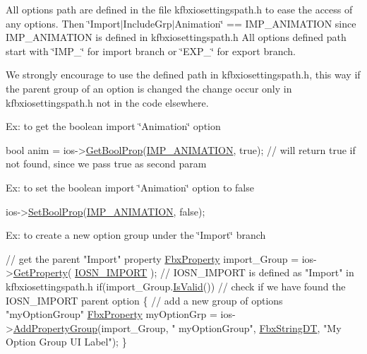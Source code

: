 All options path are defined in the file kfbxiosettingspath.\+h to ease the access of any options. Then \char`\"{}\+Import$\vert$\+Include\+Grp$\vert$\+Animation\char`\"{} == I\+M\+P\+\_\+\+A\+N\+I\+M\+A\+T\+I\+ON since I\+M\+P\+\_\+\+A\+N\+I\+M\+A\+T\+I\+ON is defined in kfbxiosettingspath.\+h All options defined path start with \char`\"{}\+I\+M\+P\+\_\+\char`\"{} for import branch or \char`\"{}\+E\+X\+P\+\_\+\char`\"{} for export branch.

We strongly encourage to use the defined path in kfbxiosettingspath.\+h, this way if the parent group of an option is changed the change occur only in kfbxiosettingspath.\+h not in the code elsewhere.

Ex\+: to get the boolean import \char`\"{}\+Animation\char`\"{} option 
\begin{DoxyCode}
\textcolor{keywordtype}{bool} anim = ios->\hyperlink{class_fbx_i_o_settings_aa30a3e515f60aa1fcbd82b6b34994ad0}{GetBoolProp}(\hyperlink{fbxiosettingspath_8h_a4725ab27021bd095307ee7337fd7ffe2}{IMP\_ANIMATION}, \textcolor{keyword}{true}); \textcolor{comment}{// will return true if not
       found, since we pass true as second param}
\end{DoxyCode}


Ex\+: to set the boolean import \char`\"{}\+Animation\char`\"{} option to false 
\begin{DoxyCode}
ios->\hyperlink{class_fbx_i_o_settings_ad2c660ef846b66dcf569079299391745}{SetBoolProp}(\hyperlink{fbxiosettingspath_8h_a4725ab27021bd095307ee7337fd7ffe2}{IMP\_ANIMATION}, \textcolor{keyword}{false});
\end{DoxyCode}


Ex\+: to create a new option group under the \char`\"{}\+Import\char`\"{} branch 
\begin{DoxyCode}
\textcolor{comment}{// get the parent "Import" property}
\hyperlink{class_fbx_property}{FbxProperty} import\_Group = ios->\hyperlink{class_fbx_i_o_settings_aa02805702152a4ef56d337c25b12d42b}{GetProperty}( \hyperlink{fbxiosettingspath_8h_aee0d01937267b561485abe6e148243ec}{IOSN\_IMPORT} ); \textcolor{comment}{// IOSN\_IMPORT
       is defined as "Import" in kfbxiosettingspath.h}
\textcolor{keywordflow}{if}(import\_Group.\hyperlink{class_fbx_property_a1c40042c55d1f4a1d4837f06fbc1d764}{IsValid}()) \textcolor{comment}{// check if we have found the IOSN\_IMPORT parent option}
\{
    \textcolor{comment}{// add a new group of options "myOptionGroup"}
      \hyperlink{class_fbx_property}{FbxProperty} myOptionGrp = ios->\hyperlink{class_fbx_i_o_settings_abf6db228c12b2b36500eba034685b3cb}{AddPropertyGroup}(import\_Group, \textcolor{stringliteral}{"
      myOptionGroup"}, \hyperlink{fbxdatatypes_8h_aa8eb40f5777b46fb5f90c98e4cd58de4}{FbxStringDT}, \textcolor{stringliteral}{"My Option Group UI Label"});
\}
\end{DoxyCode}


